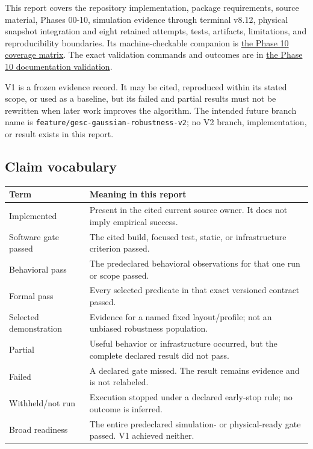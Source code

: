 \documentclass[
  10pt,
  letterpaper,
]{article}
\newcounter{none} %
\begin{document}
This report covers the repository implementation, package requirements,
source material, Phases 00-10, simulation evidence through terminal v8.12,
physical snapshot integration and eight retained attempts, tests, artifacts,
limitations, and reproducibility boundaries. Its machine-checkable companion
is \href{validation/phase_10_report_coverage.tsv}{the Phase 10 coverage matrix}.
The exact validation commands and outcomes are in
\href{validation/phase_10_documentation_validation.md}{the Phase 10 documentation validation}.

V1 is a frozen evidence record. It may be cited, reproduced within its stated
scope, or used as a baseline, but its failed and partial results must not be
rewritten when later work improves the algorithm. The intended future branch
name is \nolinkurl{feature/gesc-gaussian-robustness-v2}; no V2 branch, implementation, or
result exists in this report.

\subsection{Claim vocabulary}\label{claim-vocabulary}

{\def\LTcaptype{none} %
\begin{longtable}[]{@{}
  >{\raggedright\arraybackslash}p{}
  >{\raggedright\arraybackslash}p{}@{}}
\toprule\noalign{}
\begin{minipage}[b]{\linewidth}\raggedright
Term
\end{minipage} & \begin{minipage}[b]{\linewidth}\raggedright
Meaning in this report
\end{minipage} \\
\midrule\noalign{}
\endhead
\bottomrule\noalign{}
\endlastfoot
Implemented & Present in the cited current source owner. It does not imply empirical success. \\
Software gate passed & The cited build, focused test, static, or infrastructure criterion passed. \\
Behavioral pass & The predeclared behavioral observations for that one run or scope passed. \\
Formal pass & Every selected predicate in that exact versioned contract passed. \\
Selected demonstration & Evidence for a named fixed layout/profile; not an unbiased robustness population. \\
Partial & Useful behavior or infrastructure occurred, but the complete declared result did not pass. \\
Failed & A declared gate missed. The result remains evidence and is not relabeled. \\
Withheld/not run & Execution stopped under a declared early-stop rule; no outcome is inferred. \\
Broad readiness & The entire predeclared simulation- or physical-ready gate passed. V1 achieved neither. \\
\end{longtable}
}
\end{document}
